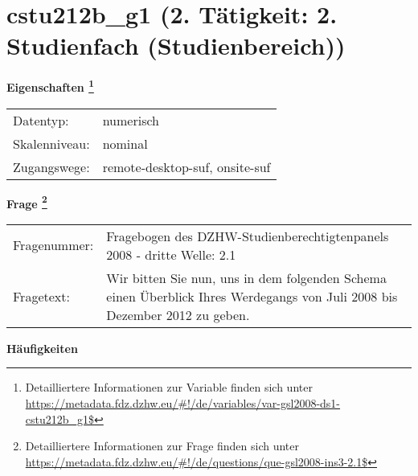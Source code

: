 
    \setcounter{footnote}{0}

    \vspace*{-1.8cm}
	\section{cstu212b\_g1 (2. Tätigkeit: 2. Studienfach (Studienbereich))}
	\label{section:cstu212b_g1}



    \vspace*{0.5cm}
    \noindent\textbf{Eigenschaften
	\footnote{Detailliertere Informationen zur Variable finden sich unter
		\url{https://metadata.fdz.dzhw.eu/\#!/de/variables/var-gsl2008-ds1-cstu212b_g1$}}}\\
	\begin{tabularx}{\hsize}{@{}lX}
	Datentyp: & numerisch \\
	Skalenniveau: & nominal \\
	Zugangswege: &
	  remote-desktop-suf, 
	  onsite-suf
 \\
    \end{tabularx}



				\vspace*{0.5cm}
                \noindent\textbf{Frage
	                \footnote{Detailliertere Informationen zur Frage finden sich unter
		              \url{https://metadata.fdz.dzhw.eu/\#!/de/questions/que-gsl2008-ins3-2.1$}}}\\
				\begin{tabularx}{\hsize}{@{}lX}
					Fragenummer: &
					  Fragebogen des DZHW-Studienberechtigtenpanels 2008 - dritte Welle:
					  2.1
 \\
					Fragetext: & Wir bitten Sie nun, uns in dem folgenden Schema einen Überblick Ihres Werdegangs von Juli 2008 bis Dezember 2012 zu geben. \\
				\end{tabularx}





        		\vspace*{0.5cm}
                \noindent\textbf{Häufigkeiten}

